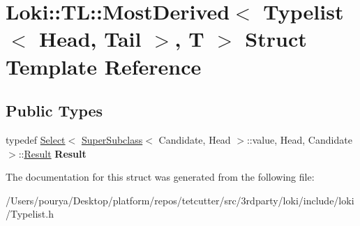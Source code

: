 \hypertarget{structLoki_1_1TL_1_1MostDerived_3_01Typelist_3_01Head_00_01Tail_01_4_00_01T_01_4}{}\section{Loki\+:\+:T\+L\+:\+:Most\+Derived$<$ Typelist$<$ Head, Tail $>$, T $>$ Struct Template Reference}
\label{structLoki_1_1TL_1_1MostDerived_3_01Typelist_3_01Head_00_01Tail_01_4_00_01T_01_4}
\subsection*{Public Types}
\begin{DoxyCompactItemize}
\item 
\hypertarget{structLoki_1_1TL_1_1MostDerived_3_01Typelist_3_01Head_00_01Tail_01_4_00_01T_01_4_a7f91e338231b47de3541b3c52f239cd7}{}typedef \hyperlink{structLoki_1_1Select}{Select}$<$ \hyperlink{structLoki_1_1SuperSubclass}{Super\+Subclass}$<$ Candidate, Head $>$\+::value, Head, Candidate $>$\+::\hyperlink{structP1}{Result} {\bfseries Result}\label{structLoki_1_1TL_1_1MostDerived_3_01Typelist_3_01Head_00_01Tail_01_4_00_01T_01_4_a7f91e338231b47de3541b3c52f239cd7}

\end{DoxyCompactItemize}


The documentation for this struct was generated from the following file\+:\begin{DoxyCompactItemize}
\item 
/\+Users/pourya/\+Desktop/platform/repos/tetcutter/src/3rdparty/loki/include/loki/Typelist.\+h\end{DoxyCompactItemize}
